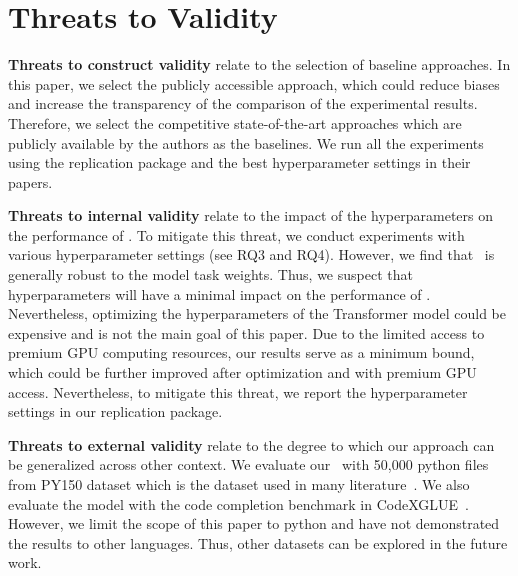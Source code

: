 \section{Threats to Validity}
\label{sec:threats to validity}



\textbf{Threats to construct validity} relate to the selection of baseline approaches.
In this paper, we select the publicly accessible approach, which could reduce biases and increase the transparency of the comparison of the experimental results. 
Therefore, 
we select the competitive state-of-the-art approaches which are publicly available by the authors as the baselines.
We run all the experiments using the replication package and the best hyperparameter settings in their papers.

\textbf{Threats to internal validity} relate to the impact of the hyperparameters on the performance of \our.
To mitigate this threat, we conduct experiments with various hyperparameter settings (see RQ3 and RQ4).
However, we find that \our~is generally robust to the model task weights.
Thus, we suspect that hyperparameters will have a minimal impact on the performance of \our.
Nevertheless, optimizing the hyperparameters of the Transformer model could be expensive and is not the main goal of this paper.
Due to the limited access to premium GPU computing resources, our results serve as a minimum bound, which could be further improved after optimization and with premium GPU access.
Nevertheless, to mitigate this threat, we report the hyperparameter settings in our replication package.


\textbf{Threats to external validity} relate to the degree to which our approach can be generalized across other context.
We evaluate our \our~with 50,000 python files from PY150 dataset which is the dataset used in many literature~\cite{lu2021codexglue, kim2021code, izadi2022codefill, li2017code, liu2020self, liu2022unified, wang2020towards}.
We also evaluate the model with the code completion benchmark in CodeXGLUE~\cite{lu2021codexglue}.
However, we limit the scope of this paper to python and have not demonstrated the results to other languages.
Thus, other datasets can be explored in the future work.
